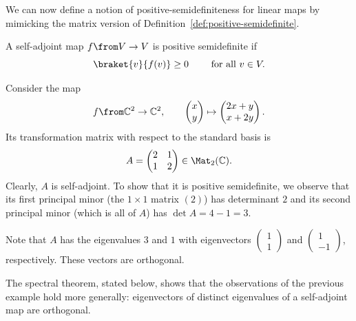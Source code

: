 \documentclass[a4paper,oneside, 12pt]{amsart}
\begin{document}
We can now define a notion of positive-semidefiniteness for linear maps by mimicking the matrix version of Definition~\ref{def:positive-semidefinite}.
\begin{definition}\label{def:positive-semidiefinite-maps}
  A self-adjoint map \(f\from V \to V\) is positive semidefinite if
  \begin{equation}
    \braket{v}{f(v)} \geq 0\qquad \text{ for all } v\in V.
  \end{equation}
\end{definition}

\begin{example}\label{ex:self-adjoint-pos-definite}
  Consider the map
  \begin{equation*}
    f \from \mathbb{C}^{2} \to \mathbb{C}^{2},\qquad
    \begin{pmatrix}
      x \\ y
    \end{pmatrix} \mapsto
    \begin{pmatrix}
      2 x + y \\ x + 2y
    \end{pmatrix}.
  \end{equation*}
  Its transformation matrix with respect to the standard basis is
  \begin{equation*}
    A=
    \begin{pmatrix}
      2 & 1 \\ 1 & 2
    \end{pmatrix} \in \Mat_{2}( \mathbb{C}).
  \end{equation*}
  Clearly, \(A\) is self-adjoint.
  To show that it is positive semidefinite, we observe that its first principal minor (the \(1\times 1\) matrix \((2)\)) has determinant \(2\) and its second principal minor (which is all of \(A\)) has  \(\det A = 4-1=3\).

  Note that \(A\) has the eigenvalues \(3\) and \(1\) with eigenvectors \(
  \begin{pmatrix}
    1 \\ 1
  \end{pmatrix}
  \) and \(
  \begin{pmatrix}
    1 \\ -1
  \end{pmatrix}
  \), respectively.
  These vectors are orthogonal.
\end{example}
The spectral theorem, stated below, shows that the observations of the previous example hold more generally: eigenvectors  of distinct eigenvalues of a self-adjoint map are orthogonal.
\end{document}
